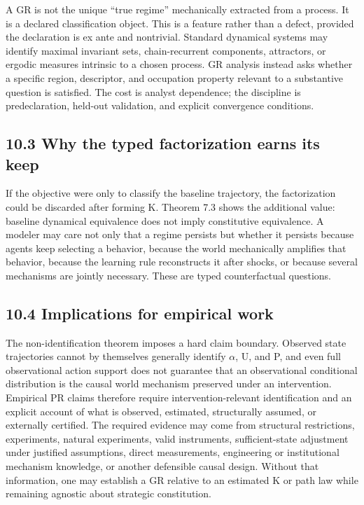 \documentclass[10pt]{article}
\begin{document}
A GR is not the unique ``true regime'' mechanically extracted from a
process. It is a declared classification object. This is a feature
rather than a defect, provided the declaration is ex ante and
nontrivial. Standard dynamical systems may identify maximal invariant
sets, chain-recurrent components, attractors, or ergodic measures
intrinsic to a chosen process. GR analysis instead asks whether a
specific region, descriptor, and occupation property relevant to a
substantive question is satisfied. The cost is analyst dependence; the
discipline is predeclaration, held-out validation, and explicit
convergence conditions.

\subsection{10.3 Why the typed factorization earns its
keep}\label{why-the-typed-factorization-earns-its-keep}

If the objective were only to classify the baseline trajectory, the
factorization could be discarded after forming K. Theorem 7.3 shows the
additional value: baseline dynamical equivalence does not imply
constitutive equivalence. A modeler may care not only that a regime
persists but whether it persists because agents keep selecting a
behavior, because the world mechanically amplifies that behavior,
because the learning rule reconstructs it after shocks, or because
several mechanisms are jointly necessary. These are typed counterfactual
questions.

\subsection{10.4 Implications for empirical
work}\label{implications-for-empirical-work}

The non-identification theorem imposes a hard claim boundary. Observed
state trajectories cannot by themselves generally identify \(\alpha\),
U, and P, and even full observational action support does not guarantee
that an observational conditional distribution is the causal world
mechanism preserved under an intervention. Empirical PR claims therefore
require intervention-relevant identification and an explicit account of
what is observed, estimated, structurally assumed, or externally
certified. The required evidence may come from structural restrictions,
experiments, natural experiments, valid instruments, sufficient-state
adjustment under justified assumptions, direct measurements, engineering
or institutional mechanism knowledge, or another defensible causal
design. Without that information, one may establish a GR relative to an
estimated K or path law while remaining agnostic about strategic
constitution.
\end{document}
